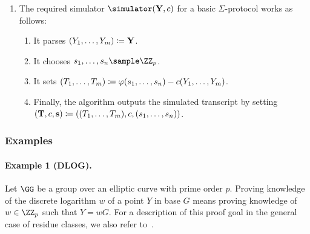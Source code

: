 \documentclass[runningheads,11pt]{article}
\begin{document}
\begin{enumerate}
  \item\label{item:basic:sim}
    The required simulator $\simulator(\vec \statement,c)$ for a basic $\Sigma$-protocol works as follows:
    \begin{enumerate}
      \item
        It parses $(Y_1,\dots,Y_m)\coloneqq \mathbf {Y}$.
      \item\label{item:basic:sim:s}
        It chooses $\response_1,\dots,\response_n\sample\ZZ_p$.
      \item
        It sets $(T_1,\dots,T_m) \coloneqq \varphi(s_1,\dots,s_n) - c(Y_1,\dots,Y_m)$.
      \item
        Finally, the algorithm outputs the simulated transcript by setting $(\mathbf {T},c,\mathbf {s})\coloneqq((T_1,\dots,T_m),c,(s_1,\dots,s_n))$.
    \end{enumerate}
\end{enumerate}


\subsubsection{Examples}

\paragraph{Example 1 (DLOG).}
Let $\GG$ be a group over an elliptic curve with prime order $p$.
Proving knowledge of the discrete logarithm $w$ of a point $Y$ in base $G$ means proving knowledge of $w\in\ZZ_p$ such that $Y=wG$.
For a description of this proof goal in the general case of residue classes, we also refer to~\cite[1.4.1]{zkproof-reference}.
\end{document}
